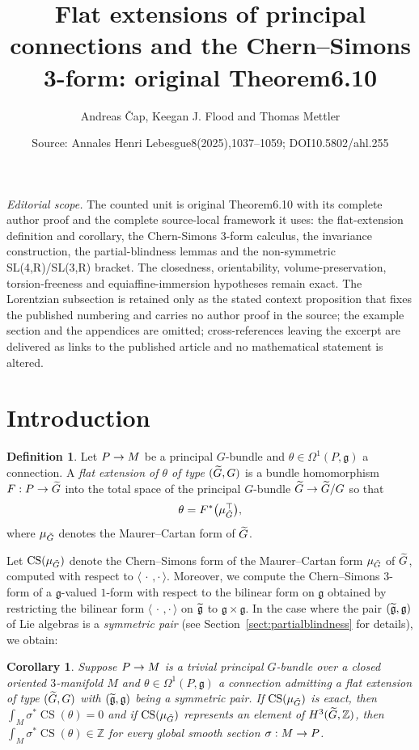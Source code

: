 \documentclass[10pt,a4paper]{amsart}
\title[Equiaffine flat extensions]{Flat extensions of principal connections and the Chern--Simons 3-form: original Theorem6.10}
\author{Andreas \v{C}ap, Keegan J. Flood and Thomas Mettler}
\date{Source: Annales Henri Lebesgue8(2025),1037--1059; DOI10.5802/ahl.255}
\newcommand{\B}[2]{\langle#1,#2\rangle}
\DeclareMathOperator{\CS}{CS}
\newcommand{\Z}{\mathbb{Z}}
\newcommand{\fkg}{\mathfrak{g}}
\renewcommand*{\to}{\mathchoice{\longrightarrow}{\rightarrow}{\rightarrow}{\rightarrow}}
\let\oldtilde\tilde
\renewcommand*{\tilde}[1]{\mathchoice{\widetilde{#1}}{\widetilde{#1}}{\oldtilde{#1}}{\oldtilde{#1}}}
\newtheorem{coro}[theo]{Corollary}
\theoremstyle{definition}\newtheorem{defi}[theo]{Definition}
\begin{document}
\maketitle
\noindent\textit{Editorial scope.} The counted unit is original Theorem6.10 with its complete author proof and the complete source-local framework it uses: the flat-extension definition and corollary, the Chern-Simons 3-form calculus, the invariance construction, the partial-blindness lemmas and the non-symmetric SL(4,R)/SL(3,R) bracket. The closedness, orientability, volume-preservation, torsion-freeness and equiaffine-immersion hypotheses remain exact. The Lorentzian subsection is retained only as the stated context proposition that fixes the published numbering and carries no author proof in the source; the example section and the appendices are omitted; cross-references leaving the excerpt are delivered as links to the published article and no mathematical statement is altered.
\section{Introduction}
\begin{defi}\label{defn:flatext}
Let $P \to M$ be a principal $G$-bundle and $\theta \in \Omega^1(P,\fkg)$ a connection. A \emph{flat extension of $\theta$ of type $(\tilde{G},G)$} is a bundle homomorphism $F : P \to \tilde{G}$ into the total space of the principal $G$-bundle $\tilde{G} \to \tilde{G}/G$ so that
\[
\theta=F^*\bigl(\mu_{\tilde{G}}^{\top}\bigr),
\]
where $\mu_{\tilde{G}}$ denotes the Maurer--Cartan form of $\tilde{G}$.
\end{defi}

Let $\CS(\mu_{\tilde G})$ denote the Chern--Simons form of the Maurer--Cartan form $\mu_{\tilde G}$ of $\tilde{G}$, computed with respect to $\B{\,\cdot\,}{\cdot\,}$. Moreover, we compute the Chern--Simons $3$-form of a $\fkg$-valued $1$-form with respect to the bilinear form on $\fkg$ obtained by restricting the bilinear form $\B{\,\cdot\,}{\cdot\,}$ on $\tilde{\fkg}$ to $\fkg\times
\fkg$. In the case where the pair $(\tilde{\fkg},\fkg)$ of Lie algebras is a \emph{symmetric pair} (see Section~\ref{sect:partialblindness} for details), we obtain:

\begin{coro}\label{cor:keystatement}
Suppose $P \to M$ is a trivial principal $G$-bundle over a closed oriented $3$-manifold $M$ and $\theta \in \Omega^1(P,\fkg)$ a connection admitting a flat extension of type $(\tilde{G},G)$ with $(\tilde{\fkg},\fkg)$ being a symmetric pair. If $\CS(\mu_{\tilde{G}})$ is exact, then ${\int_M\!\sigma^*\CS(\theta)\!=\!0}$ and if $\CS(\mu_{\tilde{G}})$ represents an element of $H^3(\tilde{G},\Z)$, then ${\int_M\!\sigma^*\CS(\theta)\!\in\!\Z}$ for every global smooth section $\sigma : M \to P$.
\end{coro}
\end{document}
